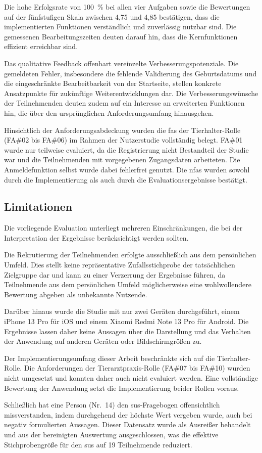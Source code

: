 Die hohe Erfolgsrate von 100~\% bei allen vier Aufgaben sowie die 
Bewertungen auf der fünfstufigen Skala zwischen 4,75 und 4,85 bestätigen, dass die 
implementierten Funktionen verständlich und zuverlässig nutzbar sind. Die gemessenen Bearbeitungszeiten deuten darauf hin, dass die Kernfunktionen effizient erreichbar sind.

Das qualitative Feedback offenbart vereinzelte Verbesserungspotenziale. 
Die gemeldeten Fehler, insbesondere die fehlende Validierung des 
Geburtsdatums und die eingeschränkte Bearbeitbarkeit von der 
Startseite, stellen konkrete Ansatzpunkte für zukünftige 
Weiterentwicklungen dar. Die Verbesserungswünsche der Teilnehmenden 
deuten zudem auf ein Interesse an erweiterten Funktionen hin, die 
über den ursprünglichen Anforderungsumfang hinausgehen.

Hinsichtlich der Anforderungsabdeckung wurden die \gls{fas} der Tierhalter-Rolle (FA\#02 bis FA\#06) im Rahmen
der Nutzerstudie vollständig belegt. FA\#01 wurde nur teilweise
evaluiert, da die Registrierung nicht Bestandteil der Studie war
und die Teilnehmenden mit vorgegebenen Zugangsdaten arbeiteten.
Die Anmeldefunktion selbst wurde dabei fehlerfrei genutzt. Die
\gls{nfas} wurden sowohl durch die
Implementierung als auch durch die Evaluationsergebnisse bestätigt.

\subsection{Limitationen}
Die vorliegende Evaluation unterliegt mehreren Einschränkungen, 
die bei der Interpretation der Ergebnisse berücksichtigt werden 
sollten.

Die Rekrutierung der Teilnehmenden erfolgte ausschließlich aus dem persönlichen Umfeld. Dies stellt keine repräsentative Zufallsstichprobe der tatsächlichen Zielgruppe dar und kann zu einer Verzerrung der Ergebnisse führen, da Teilnehmende aus dem persönlichen Umfeld möglicherweise eine wohlwollendere Bewertung abgeben als unbekannte Nutzende.

Darüber hinaus wurde die Studie mit nur zwei Geräten durchgeführt, einem iPhone 13 Pro für iOS und einem Xiaomi Redmi Note 13 Pro für Android. Die Ergebnisse lassen daher keine Aussagen über die Darstellung und das Verhalten der Anwendung auf anderen Geräten oder Bildschirmgrößen zu.

Der Implementierungsumfang dieser Arbeit beschränkte sich auf die
Tierhalter-Rolle. Die Anforderungen der Tierarztpraxis-Rolle
(FA\#07 bis FA\#10) wurden nicht umgesetzt und konnten daher auch
nicht evaluiert werden. Eine vollständige Bewertung der Anwendung
setzt die Implementierung beider Rollen voraus.

Schließlich hat eine Person (Nr.~14) den \gls{sus}-Fragebogen 
offensichtlich missverstanden, indem durchgehend der höchste Wert 
vergeben wurde, auch bei negativ formulierten Aussagen. Dieser 
Datensatz wurde als Ausreißer behandelt und aus der bereinigten 
Auswertung ausgeschlossen, was die effektive Stichprobengröße 
für den \gls{sus} auf 19 Teilnehmende reduziert.